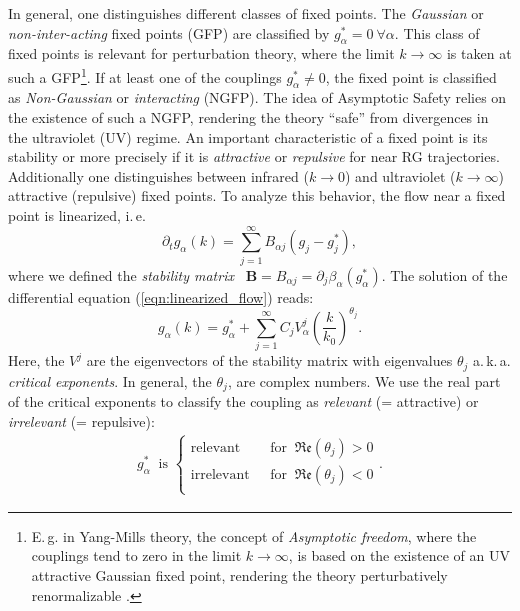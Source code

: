 In general, one distinguishes different classes of fixed points. The \textit{Gaussian} or \textit{non-inter-acting} fixed points  (GFP) are classified by $g^{*}_{\alpha}=0 \ \forall\alpha$. This class of fixed points is relevant for perturbation theory, where the limit $k\rightarrow\infty$ is taken at such a GFP\footnote{E.\,g. in Yang-Mills theory, the concept of \textit{Asymptotic freedom}, where the couplings tend to zero in the limit $k\rightarrow\infty$, is based on the existence of an UV attractive Gaussian fixed point, rendering the theory perturbatively renormalizable \cite{GrossWilczek1973}.}. If at least one of the couplings $g^{*}_{\alpha}\neq 0$, the fixed point is classified as \textit{Non-Gaussian} or \textit{interacting} (NGFP). The idea of Asymptotic Safety relies on the existence of such a NGFP, rendering the theory \enquote{safe} from divergences in the ultraviolet (UV) regime. An important characteristic of a fixed point is its stability or more precisely if it is \textit{attractive} or \textit{repulsive} for near RG trajectories. Additionally one distinguishes between infrared ($k\rightarrow0$) and ultraviolet ($k\rightarrow\infty$) attractive (repulsive) fixed points. To analyze this behavior, the flow near a fixed point is linearized, i.\,e.
\begin{equation}
	\partial_{t} g_{\alpha}(k)=\sum_{j=1}^{\infty} B_{\alpha j}\left(g_{j}-g_{j}^{*}\right),
	\label{eqn:linearized_flow}
\end{equation}
where we defined the \textit{stability matrix} \ $\mathbf{B} = B_{\alpha j} = \partial_j\beta_{\alpha}(g^{*}_{\alpha}) $. The solution of the differential equation (\ref{eqn:linearized_flow}) reads:
\begin{equation}
	g_{\alpha}(k)=g_{\alpha}^{*}+\sum_{j=1}^{\infty} C_{j} V_{\alpha}^{j}\left(\frac{k}{k_{0}}\right)^{\theta_{j}}.
\end{equation}
Here, the $V^{j}$ are the eigenvectors of the stability matrix with eigenvalues $\theta_j$ a.\,k.\,a. \textit{critical exponents}. In general, the $\theta_{j}$, are complex numbers. We use the real part of the critical exponents to classify the coupling as \textit{relevant} (= attractive) or \textit{irrelevant} (= repulsive):
\begin{align}
	g^{*}_{\alpha} \ \text{ is } \left\{\begin{array}{ll}{\text{relevant }} & {\text { for } \ \mathfrak{Re}\left(\theta_j\right) > 0} \\[10pt] {\text{irrelevant }} & {\text { for } \  \mathfrak{Re}\left(\theta_j\right) < 0} \\ \end{array}\right..
\end{align}

